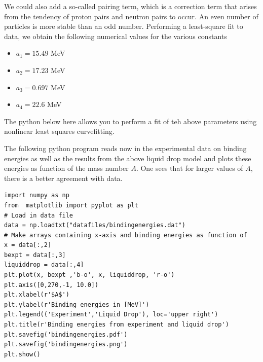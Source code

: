\documentclass[%
twoside,                 %
final,                   %
10pt]{article}
\begin{document}
\noindent
We could also add a so-called pairing term, which is a correction term that
arises from the tendency of proton pairs and neutron pairs to
occur. An even number of particles is more stable than an odd number. 
Performing a least-square fit to data, we obtain the following numerical values for the various constants
\begin{itemize}
\item $a_1=15.49$ MeV

\item $a_2=17.23$ MeV

\item $a_3=0.697$ MeV

\item $a_4=22.6$ MeV
\end{itemize}

\noindent
The python below here allows you to perform a fit of teh above parameters using nonlinear least squares curvefitting.


The following python program reads now in the experimental data on binding energies as well as the results from the above liquid drop model and plots these energies as function of the mass number $A$. One sees that for larger values of $A$, there is a better agreement with data. 
\begin{verbatim}
import numpy as np
from  matplotlib import pyplot as plt
# Load in data file
data = np.loadtxt("datafiles/bindingenergies.dat")
# Make arrays containing x-axis and binding energies as function of
x = data[:,2]
bexpt = data[:,3]
liquiddrop = data[:,4]
plt.plot(x, bexpt ,'b-o', x, liquiddrop, 'r-o')
plt.axis([0,270,-1, 10.0])
plt.xlabel(r'$A$')
plt.ylabel(r'Binding energies in [MeV]')
plt.legend(('Experiment','Liquid Drop'), loc='upper right')
plt.title(r'Binding energies from experiment and liquid drop')
plt.savefig('bindingenergies.pdf')
plt.savefig('bindingenergies.png')
plt.show()
\end{verbatim}
\end{document}
